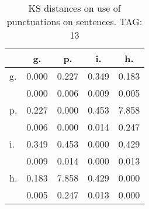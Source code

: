 \begin{table}[h!]
\begin{center}
\begin{tabular}{| l | c | c | c | c |}\hline
 & g. & p. & i. & h. \\\hline
g. & 0.000  & 0.227  & 0.349  & 0.183 \\\hline
 & 0.000  & 0.006  & 0.009  & 0.005 \\\hline
p. & 0.227  & 0.000  & 0.453  & 7.858 \\\hline
 & 0.006  & 0.000  & 0.014  & 0.247 \\\hline
i. & 0.349  & 0.453  & 0.000  & 0.429 \\\hline
 & 0.009  & 0.014  & 0.000  & 0.013 \\\hline
h. & 0.183  & 7.858  & 0.429  & 0.000 \\\hline
 & 0.005  & 0.247  & 0.013  & 0.000 \\\hline
\end{tabular}
\caption{KS distances on use of punctuations on sentences. TAG: 13}
\end{center}
\end{table}
